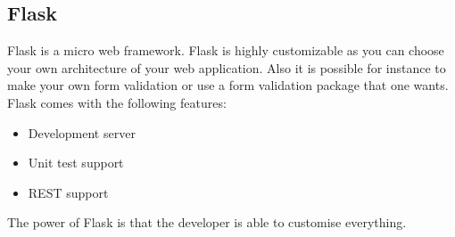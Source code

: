 \subsection{Flask}
Flask\cite{flask_official} is a micro web framework.
Flask is highly customizable as you can choose your own architecture of your web application.
Also it is possible for instance to make your own form validation or use a form validation package that one wants.
Flask comes with the following features:
\begin{itemize}
\item Development server
\item Unit test support
\item REST support
\end{itemize}
The power of Flask is that the developer is able to customise everything.
